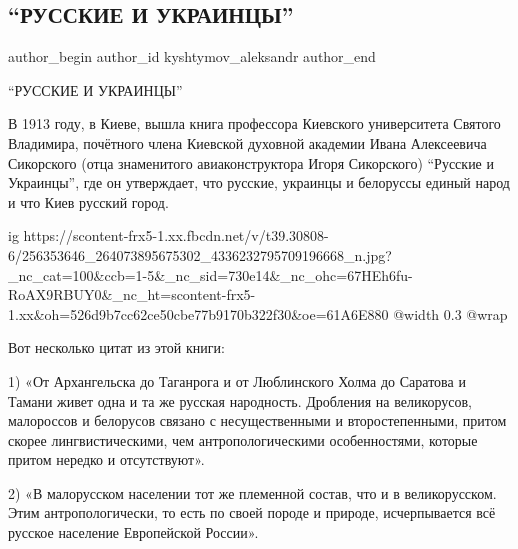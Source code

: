  
 
 
 
 
 
\subsection{\enquote{РУССКИЕ И УКРАИНЦЫ}}
\label{sec:13_11_2021.fb.kyshtymov_aleksandr.1.russkie_i_ukraincy}
 
\ifcmt
 author_begin
   author_id kyshtymov_aleksandr
 author_end
\fi

\enquote{РУССКИЕ И УКРАИНЦЫ}

В 1913 году, в Киеве, вышла книга  профессора Киевского университета Святого
Владимира, почётного члена Киевской духовной академии Ивана Алексеевича
Сикорского (отца знаменитого авиаконструктора Игоря Сикорского)  \enquote{Русские и
Украинцы}, где он утверждает, что русские, украинцы и белоруссы единый народ и
что Киев русский город.

\ifcmt
  ig https://scontent-frx5-1.xx.fbcdn.net/v/t39.30808-6/256353646_264073895675302_4336232795709196668_n.jpg?_nc_cat=100&ccb=1-5&_nc_sid=730e14&_nc_ohc=67HEh6fu-RoAX9RBUY0&_nc_ht=scontent-frx5-1.xx&oh=526d9b7cc62ce50cbe77b9170b322f30&oe=61A6E880
  @width 0.3
  @wrap 
\fi

Вот несколько цитат из  этой книги:

1) «От Архангельска до Таганрога и от Люблинского Холма до Саратова и Тамани
живет одна и та же русская народность. Дробления на великорусов, малороссов и
белорусов связано с несущественными и второстепенными, притом скорее
лингвистическими, чем антропологическими особенностями, которые притом нередко
и отсутствуют».

2) «В малорусском населении тот же племенной состав, что и в великорусском.
Этим антропологически, то есть по своей породе и природе, исчерпывается всё
русское население Европейской России».

